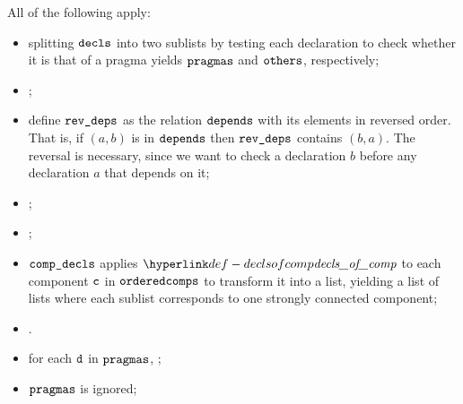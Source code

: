\ProseParagraph
All of the following apply:
\begin{itemize}
  \item splitting $\decls$ into two sublists by testing each declaration to check whether
        it is that of a pragma yields $\pragmas$ and $\others$, respectively;
  \item {};
  \item define $\reverseddependencies$ as the relation $\dependencies$ with its elements in reversed order.
        That is, if $(a,b)$ is in $\dependencies$ then $\reverseddependencies$ contains $(b, a)$.
        The reversal is necessary, since we want to check a declaration $b$ before any declaration $a$
        that depends on it;
  \item {};
  \item \Prosetopologicalorderingcomps{$\comps$}{$\reverseddependencies$}{$\orderedcomps$};
  \item $\compdecls$ applies $\declsofcomp$ to each component $\vc$ in $\orderedcomps$ to transform it into a list,
        yielding a list of lists where each sublist corresponds to one strongly connected component;
  \item \Proseannotatedeclcomps{$\genv$}{$\compdecls$}{$\newdecls$}{$\newtenv$\ProseOrTypeError}.
  \item for each $\vd$ in $\pragmas$, \Prosecheckglobalpragma{$\newtenv$}{$\vd$}\ProseOrTypeError;
  \item $\pragmas$ is ignored;
\end{itemize}

\FormallyParagraph
\begin{mathpar}
\end{mathpar}

